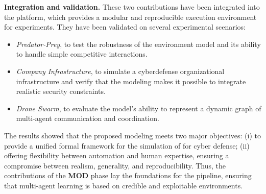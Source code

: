 \medskip
\noindent
\textbf{Integration and validation.}
These two contributions have been integrated into the  platform, which provides a modular and reproducible execution environment for experiments.
They have been validated on several experimental scenarios:
\begin{itemize}
  \item \textit{Predator-Prey}, to test the robustness of the environment model and its ability to handle simple competitive interactions.
  \item \textit{Company Infrastructure}, to simulate a cyberdefense organizational infrastructure and verify that the modeling makes it possible to integrate realistic security constraints.

  \item \textit{Drone Swarm}, to evaluate the model's ability to represent a dynamic graph of multi-agent communication and coordination.
\end{itemize}
\noindent
The results showed that the proposed modeling meets two major objectives:
(i) to provide a unified formal framework for the simulation of  for cyber defense;
(ii) offering flexibility between automation and human expertise, ensuring a compromise between realism, generality, and reproducibility.
Thus, the contributions of the \textbf{MOD} phase lay the foundations for the  pipeline, ensuring that multi-agent learning is based on credible and exploitable environments.

